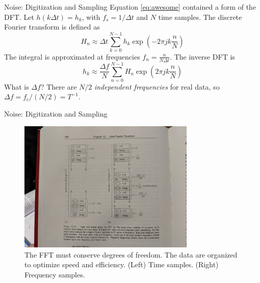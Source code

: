 \documentclass{beamer}
\begin{document}
\begin{frame}{Noise: Digitization and Sampling}
Equation \ref{eq:awesome} contained a form of the DFT.  Let $h(k\Delta t) = h_k$, with $f_s = 1/\Delta t$ and $N$ time samples. The discrete Fourier transform is defined as
\begin{equation}
H_n \approx \Delta t \sum_{k=0}^{N-1} h_k \exp\left( -2\pi j k \frac{n}{N} \right) \label{eq:fft1}
\end{equation}
The integral is approximated at frequencies $f_n = \frac{n}{N\Delta t}$. The inverse DFT is
\begin{equation}
h_k \approx \frac{\Delta f}{N}\sum_{n=0}^{N-1} H_n \exp\left( 2\pi j k \frac{n}{N} \right) \label{eq:fft2}
\end{equation}
What is $\Delta f$? There are $N/2$ \textit{independent frequencies} for real data, so $\Delta f = f_c/(N/2) = T^{-1}$.
\end{frame}

\begin{frame}{Noise: Digitization and Sampling}
\begin{figure}
\centering
\includegraphics[width=0.75\textwidth,trim=21cm 25cm 18cm 12cm,clip=true]{figures/fft.jpg}
\caption{\label{fig:fft3} The FFT must conserve degrees of freedom.  The data are organized to optimize speed and efficiency.  (Left) Time samples. (Right) Frequency samples.}
\end{figure}
\end{frame}
\end{document}
